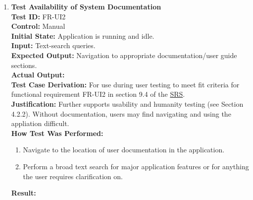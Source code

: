 \documentclass[12pt, titlepage]{article}
\begin{document}
\begin{enumerate}
    \item \textbf{Test Availability of System Documentation} \\
      \newline
      \textbf{Test ID:} FR-UI2 \\
      \textbf{Control:} Manual \\
      \textbf{Initial State:} Application is running and idle. \\
      \textbf{Input:} Text-search queries. \\
      \textbf{Expected Output:} Navigation to appropriate documentation/user guide sections. \\
      \textbf{Actual Output:} \\
      \textbf{Test Case Derivation:} For use during user testing to meet fit criteria for functional requirement FR-UI2 in section 
      9.4 of the \href{https://github.com/emilyperica/ScoreGen/blob/main/docs/SRS-Volere/SRS.pdf}{SRS}. \\
      \textbf{Justification:} Further supports usability and humanity testing (see Section 4.2.2). Without documentation, 
      users may find navigating and using the appliation difficult.\\
      \textbf{How Test Was Performed:}
      \begin{enumerate}
          \item Navigate to the location of user documentation in the application.
          \item Perform a broad text search for major application features or for anything the user requires clarification on.
      \end{enumerate}
      \textbf{Result:}
    

\end{enumerate}
\end{document}
